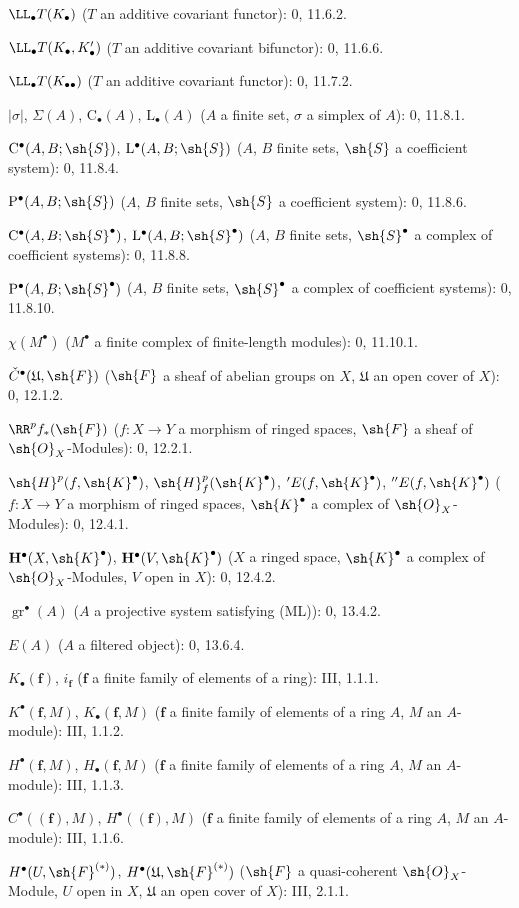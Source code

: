 \begin{flushleft}
$\LL_\bullet T(K_\bullet)$ ($T$ an additive covariant functor): 0, 11.6.2.

$\LL_\bullet T(K_\bullet,K'_\bullet)$ ($T$ an additive covariant
bifunctor): 0, 11.6.6.

$\LL_\bullet T(K_{\bullet\bullet})$ ($T$ an additive covariant functor):
0, 11.7.2.

$|\sigma|$, $\Sigma(A)$, $\mathrm C_\bullet(A)$, $\mathrm L_\bullet(A)$
($A$ a finite set, $\sigma$ a simplex of $A$): 0, 11.8.1.

$\mathrm C^\bullet(A,B;\sh{S})$, $\mathrm L^\bullet(A,B;\sh{S})$
($A$, $B$ finite sets, $\sh{S}$ a coefficient system): 0, 11.8.4.

$\mathrm P^\bullet(A,B;\sh{S})$ ($A$, $B$ finite sets, $\sh{S}$ a
coefficient system): 0, 11.8.6.

$\mathrm C^\bullet(A,B;\sh{S}^\bullet)$,
$\mathrm L^\bullet(A,B;\sh{S}^\bullet)$ ($A$, $B$ finite sets,
$\sh{S}^\bullet$ a complex of coefficient systems): 0, 11.8.8.

$\mathrm P^\bullet(A,B;\sh{S}^\bullet)$ ($A$, $B$ finite sets,
$\sh{S}^\bullet$ a complex of coefficient systems): 0, 11.8.10.

$\chi(M^\bullet)$ ($M^\bullet$ a finite complex of finite-length modules):
0, 11.10.1.

$\check C^\bullet(\mathfrak U,\sh{F})$ ($\sh{F}$ a sheaf of abelian groups
on $X$, $\mathfrak U$ an open cover of $X$): 0, 12.1.2.

$\RR^p f_*(\sh{F})$ ($f:X\to Y$ a morphism of ringed spaces,
$\sh{F}$ a sheaf of $\sh{O}_X$-Modules): 0, 12.2.1.

$\sh{H}^p(f,\sh{K}^\bullet)$,
$\sh{H}^p_f(\sh{K}^\bullet)$, ${}'E(f,\sh{K}^\bullet)$,
${}''E(f,\sh{K}^\bullet)$ ($f:X\to Y$ a morphism of ringed spaces,
$\sh{K}^\bullet$ a complex of $\sh{O}_X$-Modules): 0, 12.4.1.

$\mathbf H^\bullet(X,\sh{K}^\bullet)$,
$\mathbf H^\bullet(V,\sh{K}^\bullet)$ ($X$ a ringed space,
$\sh{K}^\bullet$ a complex of $\sh{O}_X$-Modules, $V$ open in $X$):
0, 12.4.2.

$\operatorname{gr}^\bullet(A)$ ($A$ a projective system satisfying (ML)):
0, 13.4.2.

$E(A)$ ($A$ a filtered object): 0, 13.6.4.

$K_\bullet(\mathbf f)$, $i_{\mathbf f}$ ($\mathbf f$ a finite family of
elements of a ring): III, 1.1.1.

$K^\bullet(\mathbf f,M)$, $K_\bullet(\mathbf f,M)$ ($\mathbf f$ a finite
family of elements of a ring $A$, $M$ an $A$-module): III, 1.1.2.

$H^\bullet(\mathbf f,M)$, $H_\bullet(\mathbf f,M)$ ($\mathbf f$ a finite
family of elements of a ring $A$, $M$ an $A$-module): III, 1.1.3.

$C^\bullet((\mathbf f),M)$, $H^\bullet((\mathbf f),M)$ ($\mathbf f$ a
finite family of elements of a ring $A$, $M$ an $A$-module): III, 1.1.6.

$H^\bullet(U,\sh{F}^{(*)})$,
$H^\bullet(\mathfrak U,\sh{F}^{(*)})$ ($\sh{F}$ a quasi-coherent
$\sh{O}_X$-Module, $U$ open in $X$, $\mathfrak U$ an open cover of $X$):
III, 2.1.1.
\end{flushleft}

